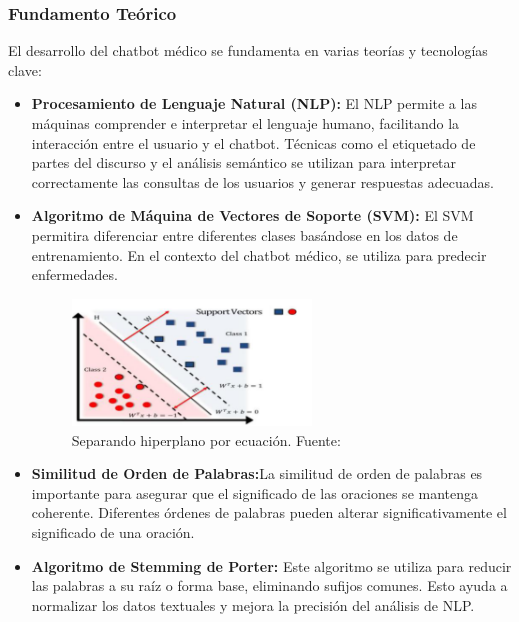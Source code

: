 \subsubsection{Fundamento Teórico}
El desarrollo del chatbot médico se fundamenta en varias teorías y tecnologías clave:

\begin{itemize}
	\item \textbf{Procesamiento de Lenguaje Natural (NLP):} El NLP permite a las máquinas comprender e interpretar el lenguaje humano, facilitando la interacción entre el usuario y el chatbot. Técnicas como el etiquetado de partes del discurso y el análisis semántico se utilizan para interpretar correctamente las consultas de los usuarios y generar respuestas adecuadas.
	
	\item \textbf{Algoritmo de Máquina de Vectores de Soporte (SVM):} El SVM permitira diferenciar entre diferentes clases basándose en los datos de entrenamiento. En el contexto del chatbot médico, se utiliza para predecir enfermedades. 
	
	\begin{figure}[H]
		\begin{center}
			\includegraphics[width=0.6\textwidth]{2/1_antecedentes/SVM-10.png}
			\caption{Separando hiperplano por ecuación. Fuente: \cite{MedicalChatBot} }
		\end{center}
	\end{figure}
	\vspace{-10mm}
	\item \textbf{Similitud de Orden de Palabras:}La similitud de orden de palabras es importante para asegurar que el significado de las oraciones se mantenga coherente. Diferentes órdenes de palabras pueden alterar significativamente el significado de una oración.
	
	\item \textbf{Algoritmo de Stemming de Porter:} Este algoritmo se utiliza para reducir las palabras a su raíz o forma base, eliminando sufijos comunes. Esto ayuda a normalizar los datos textuales y mejora la precisión del análisis de NLP.
	

\end{itemize}
